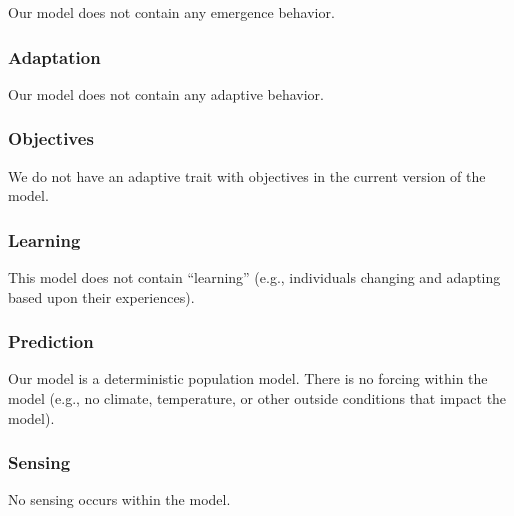 \documentclass{article}[12pt]
\begin{document}
Our model does not contain any emergence behavior.

\subsubsection{Adaptation}

Our model does not contain any adaptive behavior.

\subsubsection{Objectives}

We do not have an adaptive trait with objectives in the current version of the model.

\subsubsection{Learning}

This model does not contain ``learning'' (e.g., individuals changing and adapting based upon their experiences). 

\subsubsection{Prediction}

Our model is a deterministic population model. 
There is no forcing within the model (e.g., no climate, temperature, or other outside conditions that impact the model). 


\subsubsection{Sensing}

No sensing occurs within the model. 

\end{document}
